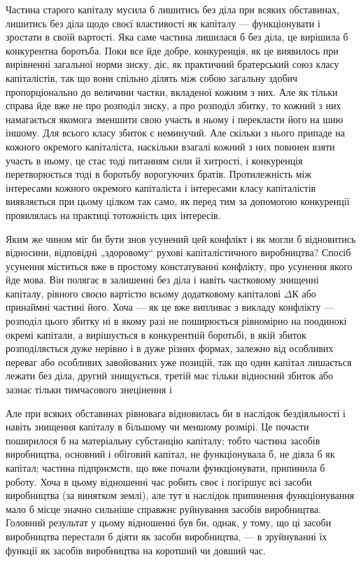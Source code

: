 
Частина старого капіталу мусила б лишитись без діла при
всяких обставинах, лишитись без діла щодо своєї властивості як
капіталу — функціонувати і зростати в своїй вартості. Яка саме
частина лишилася б без діла, це вирішила б конкурентна боротьба.
Поки все йде добре, конкуренція, як це виявилось при
вирівненні загальної норми зиску, діє, як практичний братерський
союз класу капіталістів, так що вони спільно ділять між собою загальну
здобич пропорціонально до величини частки, вкладеної
кожним з них. Але як тільки справа йде вже не про розподіл
зиску, а про розподіл збитку, то кожний з них намагається
якомога зменшити свою участь в ньому і перекласти його на
шию іншому. Для всього класу збиток є неминучий. Але скільки
з нього припаде на кожного окремого капіталіста, наскільки
взагалі кожний з них повинен взяти участь в ньому, це стає
тоді питанням сили й хитрості, і конкуренція перетворюється
тоді в боротьбу ворогуючих братів. Протилежність між інтересами
кожного окремого капіталіста і інтересами класу капіталістів виявляється
при цьому цілком так само, як перед тим за допомогою
конкуренції проявлялась на практиці тотожність цих інтересів.

Яким же чином міг би бути знов усунений цей конфлікт
і як могли б відновитись відносини, відповідні „здоровому“
рухові капіталістичного виробництва? Спосіб усунення міститься
вже в простому констатуванні конфлікту, про усунення якого
йде мова. Він полягає в залишенні без діла і навіть частковому
знищенні капіталу, рівного своєю вартістю всьому додатковому
капіталові $ΔК$ або принаймні частині його. Хоча — як
це вже випливає з викладу конфлікту — розподіл цього збитку
ні в якому разі не поширюється рівномірно на поодинокі окремі
капітали, а вирішується в конкурентній боротьбі, в якій збиток
розподіляється дуже нерівно і в дуже різних формах, залежно
від особливих переваг або особливих завойованих уже позицій,
так що один капітал лишається лежати без діла, другий знищується,
третій має тільки відносний збиток або зазнає тільки
тимчасового знецінення і~

Але при всяких обставинах рівновага відновилась би в наслідок
бездіяльності і навіть знищення капіталу в більшому чи
меншому розмірі. Це почасти поширилося б на матеріальну
субстанцію капіталу; тобто частина засобів виробництва, основний
і обіговий капітал, не функціонувала б, не діяла б як капітал;
частина підприємств, що вже почали функціонувати, припинила
б роботу. Хоча в цьому відношенні час робить своє
і погіршує всі засоби виробництва (за винятком землі), але тут
в наслідок припинення функціонування мало б місце значно
сильніше справжнє руйнування засобів виробництва. Головний
результат у цьому відношенні був би, однак, у тому, що ці засоби
виробництва перестали б діяти як засоби виробництва, — в зруйнуванні
їх функції як засобів виробництва на коротший чи довший
час.
